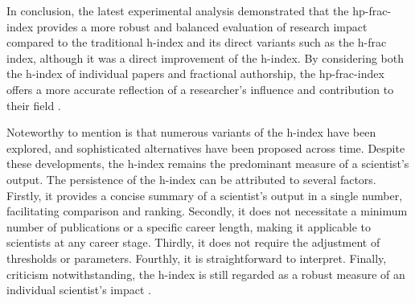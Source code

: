 In conclusion, the latest experimental analysis demonstrated that the
hp-frac-index provides a more robust and balanced evaluation of research impact
compared to the traditional h-index and its direct variants such as the h-frac
index, although it was a direct improvement of the h-index. By considering both
the h-index of individual papers and fractional authorship, the hp-frac-index
offers a more accurate reflection of a researcher’s influence and contribution
to their field \cite{singhal2023hp}.

Noteworthy to mention is that numerous variants of the h-index have been
explored, and sophisticated alternatives have been proposed across time.
Despite these developments, the h-index remains the predominant measure of a
scientist’s output. The persistence of the h-index can be attributed to several
factors. Firstly, it provides a concise summary of a scientist’s output in a
single number, facilitating comparison and ranking. Secondly, it does not
necessitate a minimum number of publications or a specific career length,
making it applicable to scientists at any career stage. Thirdly, it does not
require the adjustment of thresholds or parameters. Fourthly, it is
straightforward to interpret. Finally, criticism notwithstanding, the h-index
is still regarded as a robust measure of an individual scientist’s impact
\cite{koltun2021h}.
